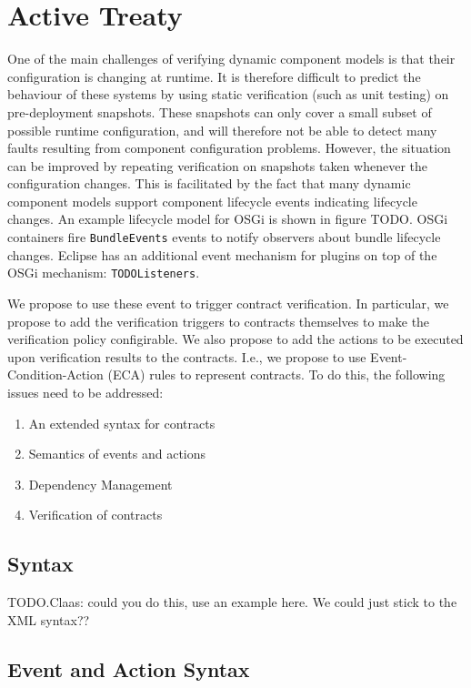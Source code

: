 \documentclass{llncs}
\begin{document}
\section{Active Treaty}

One of the main challenges of verifying dynamic component models is that their configuration is changing at runtime. It is therefore difficult to predict the behaviour of these systems by using static verification (such as unit testing) on pre-deployment snapshots. These snapshots can only cover a small subset of possible runtime configuration, and will therefore not be able to detect many faults resulting from component configuration problems. However, the situation can 
be improved by repeating verification on snapshots taken whenever the configuration changes. This is facilitated by the fact that many dynamic component models support component lifecycle  events indicating lifecycle changes. 
An example lifecycle model for OSGi is shown in figure TODO. OSGi containers fire \texttt{BundleEvents} events to notify observers about bundle lifecycle changes. Eclipse has an additional event mechanism for plugins on top of the OSGi mechanism: \texttt{TODOListeners}.  

We propose to use these event to trigger contract verification. In particular, we propose to add the verification triggers to contracts themselves to make the verification policy configirable. We also propose to add the actions to be executed 
upon verification results to the contracts. I.e., we propose to use Event-Condition-Action (ECA) rules to represent contracts. To do this, the following issues need to be addressed:

\begin{enumerate}
\item An extended syntax for contracts
\item Semantics of events and actions
\item Dependency Management
\item Verification of contracts 
\end{enumerate}


\subsection{Syntax}

TODO.Claas: could you do this, use an example here. We could just stick to the XML syntax??

\subsection{Event and Action Syntax} 
\end{document}
